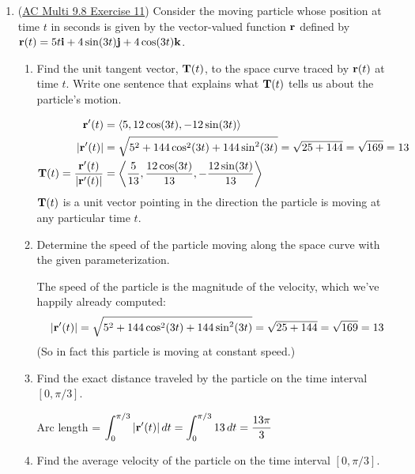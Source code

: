 \begin{enumerate}[leftmargin=0pt]
\item (\href{https://activecalculus.org/multi/S-9-8-Arc-Length-Curvature.html#Ez_9_8_1}{AC Multi 9.8 Exercise 11}) Consider the moving particle whose position at time $t$ in seconds is given by the vector-valued function $\mathbf{r}$ defined by $\mathbf{r}(t) = 5t \mathbf{i} + 4\sin(3t) \mathbf{j} + 4\cos(3t) \mathbf{k}$.
\begin{enumerate}
    \item Find the unit tangent vector, $\mathbf{T}(t)$, to the space curve traced by $\mathbf{r}(t)$ at time $t$. Write one sentence that explains what $\mathbf{T}(t)$ tells us about the particle's motion.
    \begin{red}
        \begin{align*}
            \mathbf{r}'(t) &= \left\langle 5, 12 \cos(3t), -12\sin(3t) \right\rangle\\
            |\mathbf{r}'(t)| &= \sqrt{
                5^2 + 144 \cos^2(3t) + 144 \sin^2(3t) 
            }
            = \sqrt{25 + 144} = \sqrt{169} = 13 \\
            \mathbf{T}(t) = \dfrac{\mathbf{r}'(t)}{|\mathbf{r}'(t)|} &= \left\langle
                \frac{5}{13},
                \frac{12\cos(3t)}{13},
                -\frac{12 \sin(3t)}{13}
            \right\rangle
        \end{align*}
        $\mathbf{T}(t)$ is a unit vector pointing in the direction the particle is moving at any particular time $t$.
    \end{red}
    \item Determine the speed of the particle moving along the space curve with the given parameterization.
    
    \begin{red}
        The speed of the particle is the magnitude of the velocity, which we've happily already computed:
        \[ |\mathbf{r}'(t)| = \sqrt{
            5^2 + 144 \cos^2(3t) + 144 \sin^2(3t) 
        }
        = \sqrt{25 + 144} = \sqrt{169} = 13 \]
        (So in fact this particle is moving at constant speed.)
    \end{red}
    \item Find the exact distance traveled by the particle on the time interval $[0, \pi/3]$.

    \begin{red}
        Arc length = $\displaystyle \int_0^{\pi/3} |\mathbf{r}'(t)| \, dt
        = \int_0^{\pi/3} 13\, dt = \dfrac{13\pi}{3}$
    \end{red}
    \item Find the average velocity of the particle on the time interval $[0, \pi/3]$.


\end{enumerate}
\end{enumerate}
